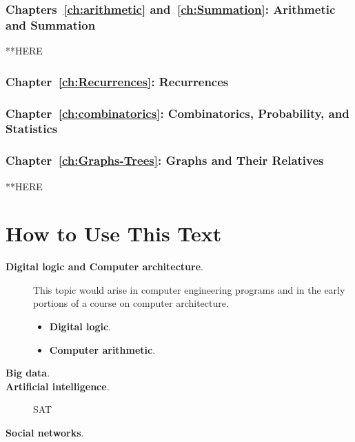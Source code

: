 \subsubsection{Chapters~\ref{ch:arithmetic} and~\ref{ch:Summation}:
Arithmetic and Summation}

**HERE

\subsubsection{Chapter~\ref{ch:Recurrences}: Recurrences}


\subsubsection{Chapter~\ref{ch:combinatorics}: Combinatorics,
  Probability, and Statistics}


\subsubsection{Chapter~\ref{ch:Graphs-Trees}: Graphs and Their Relatives}




**HERE



\section{How to Use This Text}
\label{sec:how-to-use}

\begin{description}
\item[{\bf Digital logic and Computer architecture}.]
 
This topic would arise in computer engineering programs and in the
early portions of a course on computer architecture.
\begin{itemize}
\item
{\bf Digital logic}. 
\item
{\bf Computer arithmetic}.  
\end{itemize}

\item[{\bf Big data}.]

\item[{\bf Artificial intelligence}.]
SAT

\item[{\bf Social networks}.]

\end{description}





